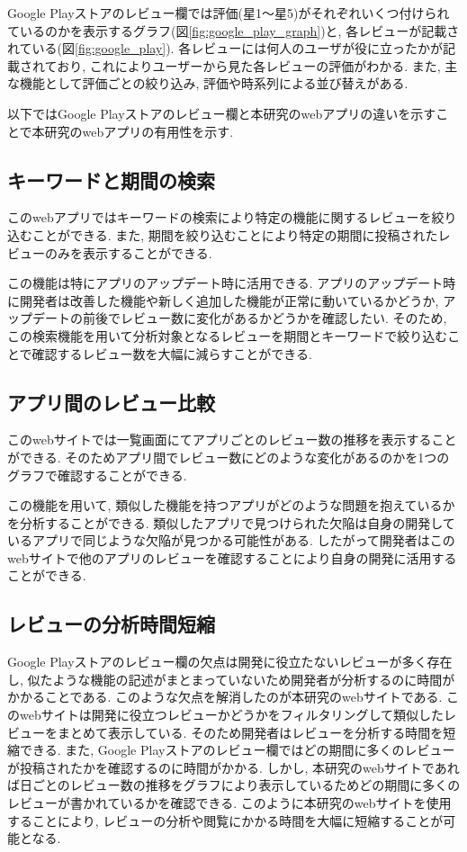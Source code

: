 Google Playストアのレビュー欄では評価(星1〜星5)がそれぞれいくつ付けられているのかを表示するグラフ(図\ref{fig:google_play_graph})と, 各レビューが記載されている(図\ref{fig:google_play}). 各レビューには何人のユーザが役に立ったかが記載されており, これによりユーザーから見た各レビューの評価がわかる. 
また, 主な機能として評価ごとの絞り込み, 評価や時系列による並び替えがある. 

以下ではGoogle Playストアのレビュー欄と本研究のwebアプリの違いを示すことで本研究のwebアプリの有用性を示す. 

\subsection{キーワードと期間の検索}
このwebアプリではキーワードの検索により特定の機能に関するレビューを絞り込むことができる. また, 期間を絞り込むことにより特定の期間に投稿されたレビューのみを表示することができる.  

この機能は特にアプリのアップデート時に活用できる. アプリのアップデート時に開発者は改善した機能や新しく追加した機能が正常に動いているかどうか, アップデートの前後でレビュー数に変化があるかどうかを確認したい. そのため, この検索機能を用いて分析対象となるレビューを期間とキーワードで絞り込むことで確認するレビュー数を大幅に減らすことができる. 

\subsection{アプリ間のレビュー比較}
このwebサイトでは一覧画面にてアプリごとのレビュー数の推移を表示することができる. そのためアプリ間でレビュー数にどのような変化があるのかを1つのグラフで確認することができる. 

この機能を用いて, 類似した機能を持つアプリがどのような問題を抱えているかを分析することができる. 類似したアプリで見つけられた欠陥は自身の開発しているアプリで同じような欠陥が見つかる可能性がある. 
したがって開発者はこのwebサイトで他のアプリのレビューを確認することにより自身の開発に活用することができる. 

\subsection{レビューの分析時間短縮}
Google Playストアのレビュー欄の欠点は開発に役立たないレビューが多く存在し, 似たような機能の記述がまとまっていないため開発者が分析するのに時間がかかることである. 
このような欠点を解消したのが本研究のwebサイトである. このwebサイトは開発に役立つレビューかどうかをフィルタリングして類似したレビューをまとめて表示している. そのため開発者はレビューを分析する時間を短縮できる. 
また, Google Playストアのレビュー欄ではどの期間に多くのレビューが投稿されたかを確認するのに時間がかかる. しかし, 本研究のwebサイトであれば日ごとのレビュー数の推移をグラフにより表示しているためどの期間に多くのレビューが書かれているかを確認できる. 
このように本研究のwebサイトを使用することにより, レビューの分析や閲覧にかかる時間を大幅に短縮することが可能となる. 

